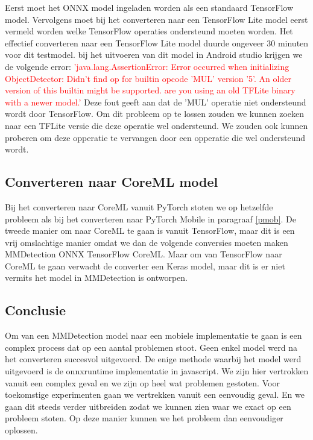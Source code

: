 Eerst moet het ONNX model ingeladen worden als een standaard TensorFlow model.
Vervolgens moet bij het converteren naar een TensorFlow Lite model eerst vermeld worden welke TensorFlow operaties ondersteund moeten worden.
Het effectief converteren naar een TensorFlow Lite model duurde ongeveer 30 minuten voor dit testmodel.
bij het uitvoeren van dit model in Android studio krijgen we de volgende error: \newline
\textcolor{red}{'java.lang.AssertionError: Error occurred when initializing ObjectDetector: Didn't find op for builtin opcode 'MUL' version '5'. An older version of this builtin might be supported. are you using an old TFLite binary with a newer model.'}\newline
Deze fout geeft aan dat de 'MUL' operatie niet ondersteund wordt door TensorFlow.
Om dit probleem op te lossen zouden we kunnen zoeken naar een TFLite versie die deze operatie wel ondersteund.
We zouden ook kunnen proberen om deze opperatie te vervangen door een opperatie die wel ondersteund wordt.

\subsection{Converteren naar CoreML model}
Bij het converteren naar CoreML vanuit PyTorch stoten we op hetzelfde probleem als bij het converteren naar PyTorch Mobile in paragraaf \ref{pmob}.
De tweede manier om naar CoreML te gaan is vanuit TensorFlow, maar dit is een vrij omslachtige manier omdat we dan de volgende conversies moeten maken MMDetection \textrightarrow ONNX \textrightarrow TensorFlow \textrightarrow CoreML. 
Maar om van TensorFlow naar CoreML te gaan verwacht de converter een Keras model, maar dit is er niet vermits het model in MMDetection is ontworpen.

\subsection{Conclusie}
Om van een MMDetection model naar een mobiele implementatie te gaan is een complex process dat op een aantal problemen stoot.
Geen enkel model werd na het converteren succesvol uitgevoerd.
De enige methode waarbij het model werd uitgevoerd is de onnxruntime implementatie in javascript.
We zijn hier vertrokken vanuit een complex geval en we zijn op heel wat problemen gestoten.
Voor toekomstige experimenten gaan we vertrekken vanuit een eenvoudig geval.
En we gaan dit steeds verder uitbreiden zodat we kunnen zien waar we exact op een probleem stoten.
Op deze manier kunnen we het probleem dan eenvoudiger oplossen.